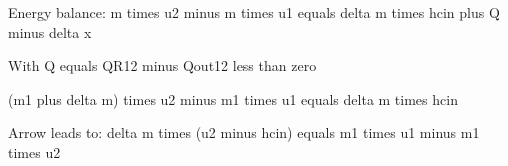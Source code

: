 Energy balance:  
m times u2 minus m times u1 equals delta m times hcin plus Q minus delta x  

With Q equals QR12 minus Qout12 less than zero  

(m1 plus delta m) times u2 minus m1 times u1 equals delta m times hcin  

Arrow leads to:  
delta m times (u2 minus hcin) equals m1 times u1 minus m1 times u2